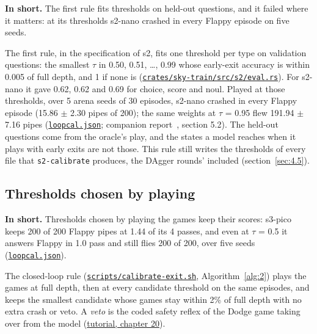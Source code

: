 \documentclass[10pt]{article}
\begin{document}
\textbf{In short.} The first rule fits thresholds on held-out questions, and it failed where it matters: at its thresholds s2-nano crashed in every Flappy episode on five seeds.

The first rule, in the specification of s2, fits one threshold per type on validation questions: the smallest $\tau$ in 0.50, 0.51, \ldots{}, 0.99 whose early-exit accuracy is within 0.005 of full depth, and 1 if none is (\href{https://github.com/maxgfr/skycmd/blob/main/crates/sky-train/src/s2/eval.rs}{\texttt{crates/\allowbreak{}sky-train/\allowbreak{}src/\allowbreak{}s2/\allowbreak{}eval.rs}}). For s2-nano it gave 0.62, 0.62 and 0.69 for choice, score and noul. Played at those thresholds, over 5 arena seeds of 30 episodes, s2-nano crashed in every Flappy episode (15.86 $\pm$ 2.30 pipes of 200); the same weights at $\tau$ = 0.95 flew 191.94 $\pm$ 7.16 pipes (\href{https://maxgfr.github.io/skycmd/results/loopcal.json}{\texttt{loopcal.json}}; companion report~\cite{golfier2026skycmd}, section 5.2). The held-out questions come from the oracle's play, and the states a model reaches when it plays with early exits are not those. This rule still writes the thresholds of every file that \texttt{s2-calibrate} produces, the DAgger rounds' included (section~\ref{sec:4.5}).

\subsection{Thresholds chosen by playing}\label{sec:5.3}

\textbf{In short.} Thresholds chosen by playing the games keep their scores: s3-pico keeps 200 of 200 Flappy pipes at 1.44 of its 4 passes, and even at $\tau$ = 0.5 it answers Flappy in 1.0 pass and still flies 200 of 200, over five seeds (\href{https://maxgfr.github.io/skycmd/results/loopcal.json}{\texttt{loopcal.json}}).

The closed-loop rule (\href{https://github.com/maxgfr/skycmd/blob/main/scripts/calibrate-exit.sh}{\texttt{scripts/\allowbreak{}calibrate-exit.sh}}, Algorithm~\ref{alg:2}) plays the games at full depth, then at every candidate threshold on the same episodes, and keeps the smallest candidate whose games stay within 2\% of full depth with no extra crash or veto. A \emph{veto} is the coded safety reflex of the Dodge game taking over from the model (\href{https://maxgfr.github.io/skycmd/tutorial/20-dagger-lessons}{tutorial, chapter 20}).
\end{document}
